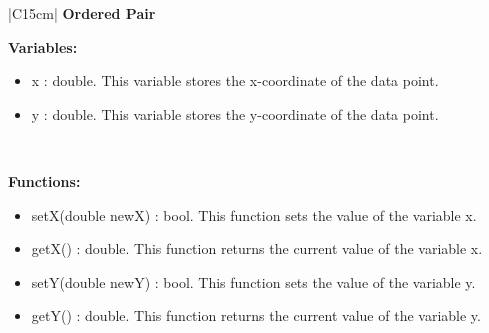 \begin{center}
    \begin{tabular}{|C{15cm}|}
        \hline
            \textbf{Ordered Pair} \\
        \hline
            \begin{flushleft}
                \textbf{Variables: }\\
            \end{flushleft}
                \begin{itemize}
                    \item x : double. This variable stores the x-coordinate of the data point.
                    \item y : double. This variable stores the y-coordinate of the data point.
                \end{itemize} \\
            \hline
            \begin{flushleft}
                \textbf{Functions: } \\
            \end{flushleft}
                \begin{itemize}
                    \item setX(double newX) : bool. This function sets the value of the variable x.
                    \item getX() : double. This function returns the current value of the variable x.
                    \item setY(double newY) : bool. This function sets the value of the variable y.
                    \item getY() : double. This function returns the current value of the variable y.
                \end{itemize}
                \\
            \hline
    \end{tabular}
\end{center}